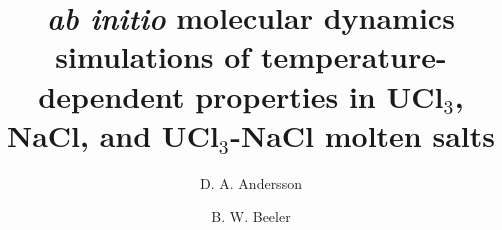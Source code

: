 \documentclass[preprint,3p,10pt,twocolumn,number,sort&compress]{elsarticle}
\begin{document}
\begin{frontmatter}



\title{\textit{ab initio} molecular dynamics simulations of temperature-dependent properties in UCl$_3$, NaCl, and UCl$_3$-NaCl molten salts}

\author[label1]{D. A. Andersson}
\author[label2,label3]{B. W. Beeler}
\address[label1]{Los Alamos National Laboratory}
\address[label2]{North Carolina State University}
\address[label3]{Idaho National Laboratory}


\end{frontmatter}
\end{document}
